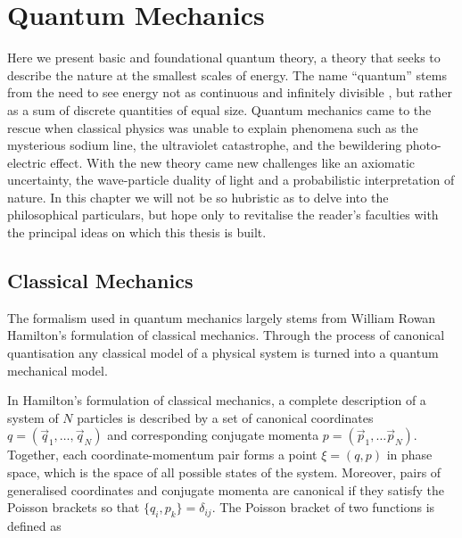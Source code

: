 \chapter{Quantum Mechanics}

    Here we present basic and foundational quantum theory, a theory that seeks to 
    describe the nature at the smallest scales of energy. The name ``quantum'' stems 
    from the need to see energy not as continuous and infinitely divisible 
    , but rather 
    as a sum of discrete quantities of equal size. Quantum mechanics came to the 
    rescue when classical physics was unable to explain phenomena such as the mysterious 
    sodium line, the ultraviolet catastrophe, and the bewildering photo-electric effect.
    With the new theory came new challenges like an axiomatic uncertainty, 
    the wave-particle duality of light and a 
    probabilistic interpretation of nature. In this chapter we will not be so hubristic 
    as to delve into the philosophical particulars, but hope only to revitalise the 
    reader's faculties with the principal ideas on which this thesis is built.

\section{Classical Mechanics}

    The formalism used in quantum mechanics largely stems from William Rowan Hamilton's 
    formulation of classical mechanics. Through the process of canonical
    quantisation any classical model of a physical system is turned into
    a quantum mechanical model.

    In Hamilton's formulation of classical mechanics, a complete description of a system
    of $N$ particles is described by a set of canonical coordinates 
    $q = (\vec{q}_1, \dots, \vec{q}_N)$ and corresponding conjugate momenta
    $p = (\vec{p}_1, \dots \vec{p}_N)$. Together, each coordinate-momentum pair
    forms a point $\xi = (q, p)$ in phase space, which is the space of all possible states
    of the system. Moreover, pairs of generalised coordinates and conjugate
    momenta are canonical if they satisfy the Poisson brackets so that 
    $\{q_i, p_k\} = \delta_{ij}$. The Poisson bracket of two functions is defined as 

